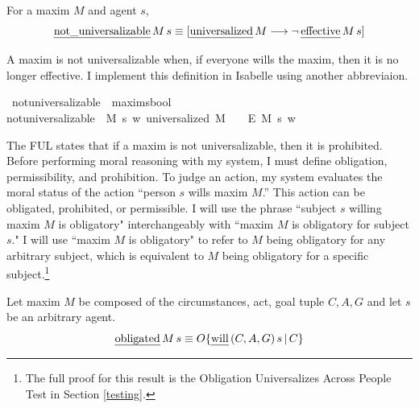 \begin{isabellebody}
\begin{isamarkuptext}
\begin{definition}
For a maxim $M$ and agent $s$,
$$\text{\emph{not\_universalizable}} \, M \, s  \equiv [ \text{\emph{universalized}} \, M \longrightarrow \neg \, \text{\emph{effective}} \, M \, s ]$$
\end{definition}
\noindent A maxim is not universalizable when, if everyone wills the maxim, then it is no longer effective.
I implement this definition in Isabelle using another abbreviaion.%
\end{isamarkuptext}\isamarkuptrue%
\isamarkupfalse%
\ not{\isacharunderscore}universalizable\ {\isacharcolon}{\isacharcolon}\ {\isachardoublequoteopen}maxim{\isasymRightarrow}s{\isasymRightarrow}bool{\isachardoublequoteclose}\ \ \isanewline
{\isachardoublequoteopen}not{\isacharunderscore}universalizable\ {\isasymequiv}\ {\isasymlambda}M\ s{\isachardot}\ {\isasymforall}w{\isachardot}\ {\isacharparenleft}{\isacharparenleft}universalized\ M{\isacharparenright}\ \ \isactrlbold {\isasymrightarrow}\ {\isacharparenleft}\isactrlbold {\isasymnot}\ {\isacharparenleft}E\ M\ s{\isacharparenright}{\isacharparenright}{\isacharparenright}\ w{\isachardoublequoteclose}\isanewline
%
%
\begin{isamarkuptext}%
The FUL states that if a maxim is not universalizable, then it is prohibited. Before performing
moral reasoning with my system, I must define obligation, permissibility, and prohibition.
To judge an action, my system evaluates the moral status of the action 
``person $s$ wills maxim $M$.'' This action can be obligated, prohibited, or permissible.
I will use the phrase ``subject $s$ willing maxim $M$ is obligatory" 
interchangeably with ``maxim $M$ is obligatory for subject $s$." I will use ``maxim $M$ is obligatory" to 
refer to $M$ being obligatory for any arbitrary subject, which is equivalent to $M$ being 
obligatory for a specific subject.\footnote{The full proof for this result is the Obligation Universalizes
Across People Test in Section \ref{testing}.}

\begin{definition}[Obligation]

Let maxim $M$ be composed of the circumstances, act, goal tuple $C, A, G$ and let $s$ be an arbitrary agent.
$$\text{\emph{obligated}} \, M \, s \equiv O\{ \text{\emph{will}} \, (C, A, G) \, s \, | \, C\}$$
\end{definition}


\end{isamarkuptext}
\end{isabellebody}
